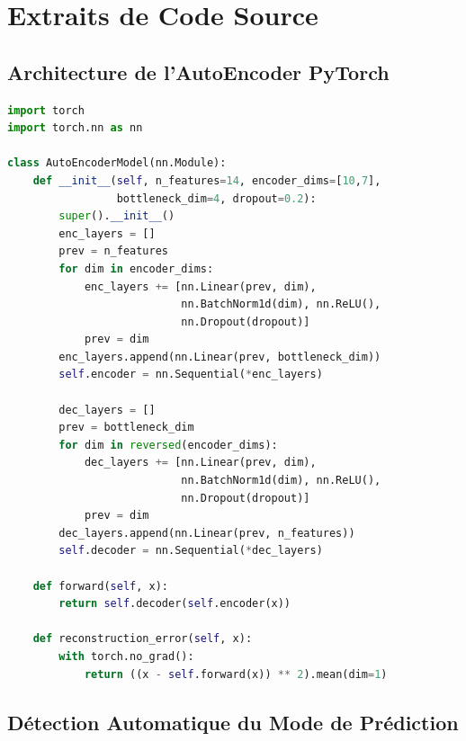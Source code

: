 \documentclass[12pt,a4paper,twoside]{report}
\theoremstyle{definition}
\begin{document}
\chapter{Extraits de Code Source}

\section{Architecture de l'AutoEncoder PyTorch}

\begin{lstlisting}[language=Python,
  caption={AutoEncoderModel --- architecture encodeur/décodeur symétrique},
  label={lst:autoencoder}]
import torch
import torch.nn as nn

class AutoEncoderModel(nn.Module):
    def __init__(self, n_features=14, encoder_dims=[10,7],
                 bottleneck_dim=4, dropout=0.2):
        super().__init__()
        enc_layers = []
        prev = n_features
        for dim in encoder_dims:
            enc_layers += [nn.Linear(prev, dim),
                           nn.BatchNorm1d(dim), nn.ReLU(),
                           nn.Dropout(dropout)]
            prev = dim
        enc_layers.append(nn.Linear(prev, bottleneck_dim))
        self.encoder = nn.Sequential(*enc_layers)

        dec_layers = []
        prev = bottleneck_dim
        for dim in reversed(encoder_dims):
            dec_layers += [nn.Linear(prev, dim),
                           nn.BatchNorm1d(dim), nn.ReLU(),
                           nn.Dropout(dropout)]
            prev = dim
        dec_layers.append(nn.Linear(prev, n_features))
        self.decoder = nn.Sequential(*dec_layers)

    def forward(self, x):
        return self.decoder(self.encoder(x))

    def reconstruction_error(self, x):
        with torch.no_grad():
            return ((x - self.forward(x)) ** 2).mean(dim=1)
\end{lstlisting}

\section{Détection Automatique du Mode de Prédiction}
\end{document}
